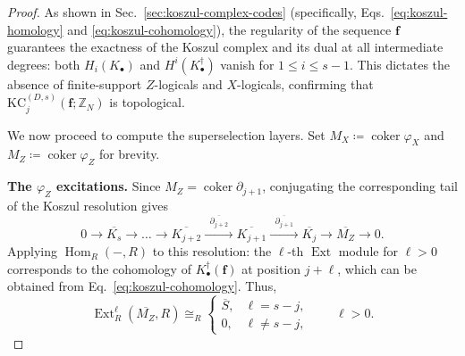 \documentclass[aps,prx,english,superscriptaddress,twocolumn,tightenlines,showpacs,longbibliography,floatfix,amsfonts]{revtex4-2}
\theoremstyle{remark}
\theoremstyle{definition}
\begin{document}
\begin{proof}
	As shown in Sec.~\ref{sec:koszul-complex-codes} (specifically, Eqs.~\eqref{eq:koszul-homology} and \eqref{eq:koszul-cohomology}), the regularity of the sequence $\mathbf{f}$ guarantees the exactness of the Koszul complex and its dual at all intermediate degrees: both $H_i(K_\bullet)$ and $H^i(K_\bullet^\dagger)$ vanish for $1 \le i \le s-1$. This dictates the absence of finite-support $Z$-logicals and $X$-logicals, confirming that $\mathrm{KC}_j^{(D,s)}(\mathbf{f}; \mathbb{Z}_N)$ is topological.

	We now proceed to compute the superselection layers. Set
	\(M_X\coloneqq\operatorname{coker}\varphi_X\) and
	\(M_Z\coloneqq\operatorname{coker}\varphi_Z\) for brevity.

	\textbf{The $\varphi_Z$ excitations.}
	Since \(M_Z=\operatorname{coker}\partial_{j+1}\), conjugating the
	corresponding tail of the Koszul resolution gives
	\[
	0 \to \overline{K_s} \longrightarrow \dots \longrightarrow \overline{K_{j+2}} \xrightarrow{\;\;\overline{\partial_{j+2}}\;\;} \overline{K_{j+1}} \xrightarrow{\;\;\overline{\partial_{j+1}}\;\;} \overline{K_j} \to \overline{M_Z} \to 0.
	\]
	Applying $\operatorname{Hom}_R(-,R)$ to this resolution: the $\ell$-th $\operatorname{Ext}$ module for $\ell>0$ corresponds to the cohomology of $K_\bullet^\dagger (\mathbf{f})$ at position $j+\ell$, which can be obtained from Eq.~\eqref{eq:koszul-cohomology}. Thus,
	\begin{equation}
		\operatorname{Ext}_R^\ell(\overline{M_Z},R)\cong_R
		\begin{cases}
			\overline{S}, & \ell=s-j,\\[2pt]
			0, & \ell\neq s-j,
		\end{cases}\qquad \ell>0.
	\end{equation}


\end{proof}
\end{document}
